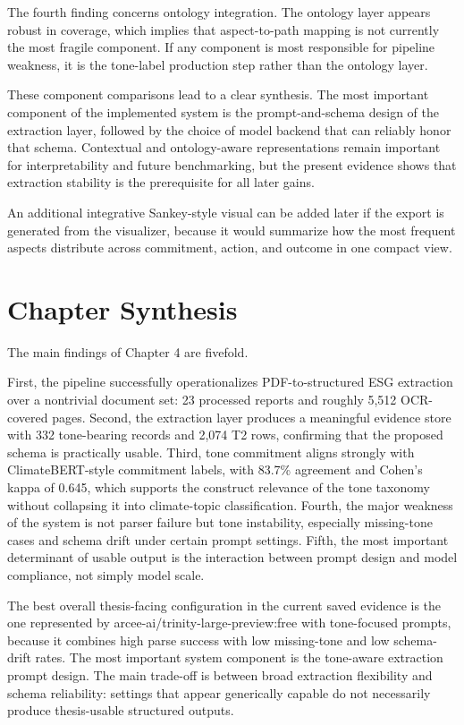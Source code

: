 The fourth finding concerns ontology integration. The ontology layer appears robust in coverage, which implies that aspect-to-path mapping is not currently the most fragile component. If any component is most responsible for pipeline weakness, it is the tone-label production step rather than the ontology layer.

These component comparisons lead to a clear synthesis. The most important component of the implemented system is the prompt-and-schema design of the extraction layer, followed by the choice of model backend that can reliably honor that schema. Contextual and ontology-aware representations remain important for interpretability and future benchmarking, but the present evidence shows that extraction stability is the prerequisite for all later gains.

An additional integrative Sankey-style visual can be added later if the export is generated from the visualizer, because it would summarize how the most frequent aspects distribute across commitment, action, and outcome in one compact view.

\section{Chapter Synthesis}

The main findings of Chapter 4 are fivefold.

First, the pipeline successfully operationalizes PDF-to-structured ESG extraction over a nontrivial document set: 23 processed reports and roughly 5,512 OCR-covered pages. Second, the extraction layer produces a meaningful evidence store with 332 tone-bearing records and 2,074 T2 rows, confirming that the proposed schema is practically usable. Third, tone commitment aligns strongly with ClimateBERT-style commitment labels, with 83.7\% agreement and Cohen’s kappa of 0.645, which supports the construct relevance of the tone taxonomy without collapsing it into climate-topic classification. Fourth, the major weakness of the system is not parser failure but tone instability, especially missing-tone cases and schema drift under certain prompt settings. Fifth, the most important determinant of usable output is the interaction between prompt design and model compliance, not simply model scale.

The best overall thesis-facing configuration in the current saved evidence is the one represented by arcee-ai/trinity-large-preview:free with tone-focused prompts, because it combines high parse success with low missing-tone and low schema-drift rates. The most important system component is the tone-aware extraction prompt design. The main trade-off is between broad extraction flexibility and schema reliability: settings that appear generically capable do not necessarily produce thesis-usable structured outputs.


